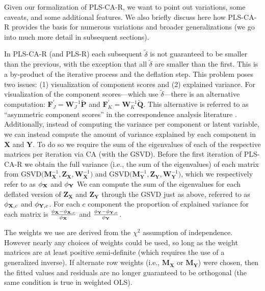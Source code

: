 \documentclass[12pt]{article}
\begin{document}
Given our formalization of PLS-CA-R, we want to point out variations,
some caveats, and some additional features. We also briefly discuss here
how PLS-CA-R provides the basis for numerous variations and broader
generalizations (we go into much more detail in subsequent sections).

In PLS-CA-R (and PLS-R) each subsequent \(\widetilde{\delta}\) is not
guaranteed to be smaller than the previous, with the exception that all
\(\widetilde \delta\) are smaller than the first. This is a by-product
of the iterative process and the deflation step. This problem poses two
issues: (1) visualization of component scores and (2) explained
variance. For visualization of the component scores---which use
\(\widetilde \delta\)---there is an alternative computation:
\({\mathbf F}^{'}_{J} = {\mathbf W}_{J}^{-1}\widetilde{\mathbf P}\) and
\({\mathbf F}^{'}_{K} = {\mathbf W}_{K}^{-1}\widetilde{\mathbf Q}\).
This alternative is referred to as ``asymmetric component scores'' in
the correspondence analysis literature
\citep{abdi2014correspondence, greenacre1993biplots}. Additionally,
instead of computing the variance per component or latent variable, we
can instead compute the amount of variance explained by each component
in \(\mathbf X\) and \(\mathbf Y\). To do so we require the sum of the
eigenvalues of each of the respective matrices per iteration via CA
(with the GSVD). Before the first iteration of PLS-CA-R we obtain the
full variance (i.e., the sum of the eigenvalues) of each matrix from
\(\mathrm{GSVD(} {\mathbf M}^{-1}_{\mathbf X}, {\mathbf Z}_{\mathbf X}, {\mathbf W}^{-1}_{\mathbf X} \mathrm{)}\)
and
\(\mathrm{GSVD(} {\mathbf M}^{-1}_{\mathbf Y}, {\mathbf Z}_{\mathbf Y}, {\mathbf W}^{-1}_{\mathbf Y} \mathrm{)}\),
which we respectively refer to as \({\phi}_{\bf X}\) and
\({\phi}_{\bf Y}\) We can compute the sum of the eigenvalues for each
deflated version of \({\mathbf Z}_{\mathbf X}\) and
\({\mathbf Z}_{\mathbf Y}\) through the GSVD just as above, referred to
as \({\phi}_{{\bf X},c}\) and \({\phi}_{{\bf Y},c}\). For each \(c\)
component the proportion of explained variance for each matrix is
\(\frac{{\phi}_{\bf X} - {\phi}_{{\bf X},c}}{{\phi}_{\bf X}}\) and
\(\frac{{\phi}_{\bf Y} - {\phi}_{{\bf Y},c}}{{\phi}_{\bf Y}}\).

The weights we use are derived from the \(\chi^2\) assumption of
independence. However nearly any choices of weights could be used, so
long as the weight matrices are at least positive semi-definite (which
requires the use of a generalized inverse). If alternate row weights
(i.e., \({\mathbf M}_{\mathbf X}\) or \({\mathbf M}_{\mathbf Y}\)) were
chosen, then the fitted values and residuals are no longer guaranteed to
be orthogonal (the same condition is true in weighted OLS).
\end{document}
